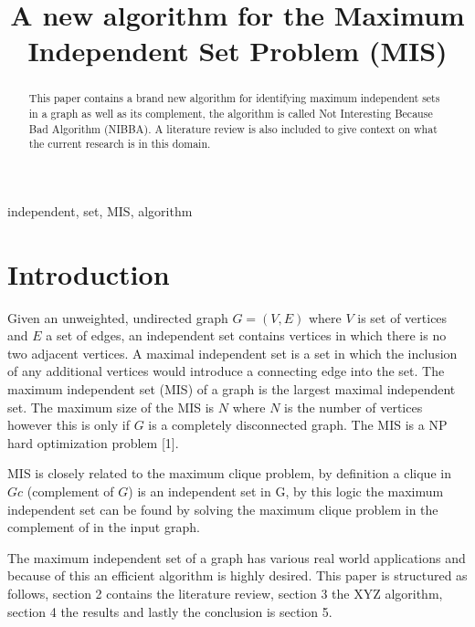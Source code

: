 \documentclass[conference]{IEEEtran}
\begin{document}
\title{A new algorithm for the Maximum Independent Set Problem (MIS)}

\author{
}

\maketitle

\begin{abstract}
This paper contains a brand new algorithm for identifying maximum independent sets in a graph as well as its complement, 
the algorithm is called Not Interesting Because Bad Algorithm (NIBBA). A literature review is also included to give 
context on what the current research is in this domain. 
\end{abstract}

\begin{IEEEkeywords}
independent, set, MIS, algorithm
\end{IEEEkeywords}

\section{Introduction}
Given an unweighted, undirected graph $G = (V, E)$ where $V$ is set of vertices and $E$ a set of edges, an 
independent set contains vertices in which there is no two adjacent vertices. A maximal independent set is a set in 
which the inclusion of any additional vertices would introduce a connecting edge into the set. The maximum independent 
set (MIS) of a graph is the largest maximal independent set. The maximum size of the MIS is $N$ where $N$ is the number
of vertices however this is only if $G$ is a completely disconnected graph. The MIS is a NP hard optimization problem [1].

MIS is closely related to the maximum clique problem, by definition a clique in $Gc$ (complement of $G$) is an 
independent set in G, by this logic the maximum independent set can be found by solving the maximum clique problem in 
the complement of in the input graph. 

The maximum independent set of a graph has various real world applications and because of this an efficient algorithm is 
highly desired. This paper is structured as follows, section 2 contains the literature review, section 3 the XYZ algorithm, section 4 
the results and lastly the conclusion is section 5.
\end{document}
